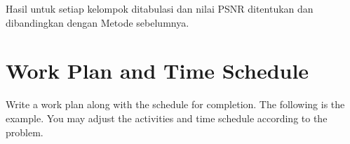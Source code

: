 \documentclass{ittelkom}
\begin{document}
Hasil untuk setiap kelompok ditabulasi dan nilai PSNR ditentukan dan
dibandingkan dengan Metode sebelumnya.





\section{Work Plan and Time Schedule}
Write a work plan along with the schedule for completion. The following is the
example. You may adjust the activities and time schedule according to the
problem. \newline
\end{document}
